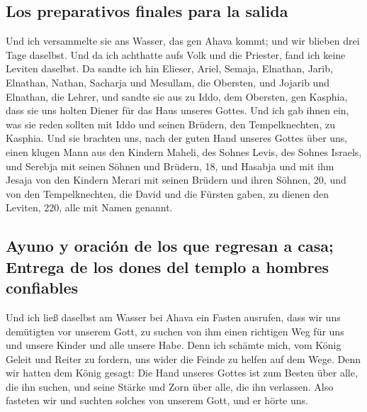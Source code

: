 \hypertarget{los-preparativos-finales-para-la-salida}{%
\subsection{Los preparativos finales para la
salida}\label{los-preparativos-finales-para-la-salida}}

 Und ich versammelte sie ans Wasser, das gen Ahava kommt;
und wir blieben drei Tage daselbst. Und da ich achthatte aufs Volk und
die Priester, fand ich keine Leviten daselbst.  Da sandte
ich hin Elieser, Ariel, Semaja, Elnathan, Jarib, Elnathan, Nathan,
Sacharja und Mesullam, die Obersten, und Jojarib und Elnathan, die
Lehrer,  und sandte sie aus zu Iddo, dem Obersten, gen
Kasphia, dass sie uns holten Diener für das Haus unseres Gottes. Und ich
gab ihnen ein, was sie reden sollten mit Iddo und seinen Brüdern, den
Tempelknechten, zu Kasphia.  Und sie brachten uns, nach
der guten Hand unseres Gottes über uns, einen klugen Mann aus den
Kindern Maheli, des Sohnes Levis, des Sohnes Israels, und Serebja mit
seinen Söhnen und Brüdern, 18,  und Hasabja und mit ihm
Jesaja von den Kindern Merari mit seinen Brüdern und ihren Söhnen, 20,
 und von den Tempelknechten, die David und die Fürsten
gaben, zu dienen den Leviten, 220, alle mit Namen genannt.

\hypertarget{ayuno-y-oraciuxf3n-de-los-que-regresan-a-casa-entrega-de-los-dones-del-templo-a-hombres-confiables}{%
\subsection{Ayuno y oración de los que regresan a casa; Entrega de los
dones del templo a hombres
confiables}\label{ayuno-y-oraciuxf3n-de-los-que-regresan-a-casa-entrega-de-los-dones-del-templo-a-hombres-confiables}}

 Und ich ließ daselbst am Wasser bei Ahava ein Fasten
ausrufen, dass wir uns demütigten vor unserem Gott, zu suchen von ihm
einen richtigen Weg für uns und unsere Kinder und alle unsere Habe.
 Denn ich schämte mich, vom König Geleit und Reiter zu
fordern, uns wider die Feinde zu helfen auf dem Wege. Denn wir hatten
dem König gesagt: Die Hand unseres Gottes ist zum Besten über alle, die
ihn suchen, und seine Stärke und Zorn über alle, die ihn verlassen.
 Also fasteten wir und suchten solches von unserem Gott,
und er hörte uns.

